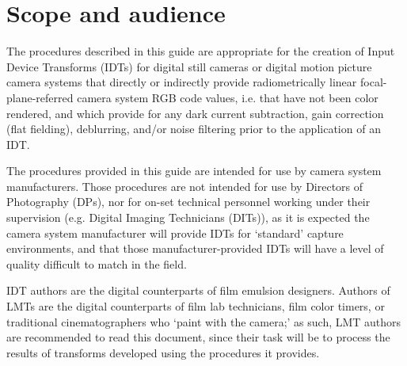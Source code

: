 \cleardoublepage
\numberedformat	
\chapter{Scope and audience} 	%

The procedures described in this guide are appropriate for the creation of Input Device Transforms (IDTs) for digital still cameras or digital motion picture camera systems that directly or indirectly provide radiometrically linear focal-plane-referred camera system RGB code values, i.e. that have not been color rendered, and which provide for any dark current subtraction, gain correction (flat fielding), deblurring, and/or noise filtering prior to the application of an IDT. 

The procedures provided in this guide are intended for use by camera system manufacturers. Those procedures are not intended for use by Directors of Photography (DPs), nor for on-set technical personnel working under their supervision (e.g. Digital Imaging Technicians (DITs)), as it is expected the camera system manufacturer will provide IDTs for `standard' capture environments, and that those manufacturer-provided IDTs will have a level of quality difficult to match in the field.

IDT authors are the digital counterparts of film emulsion designers. Authors of LMTs are the digital counterparts of film lab technicians, film color timers, or traditional cinematographers who `paint with the camera;' as such, LMT authors are recommended to read this document, since their task will be to process the results of transforms developed using the procedures it provides.